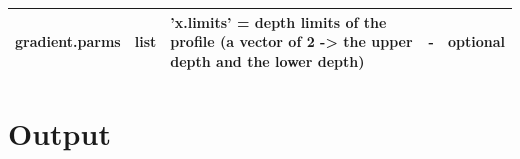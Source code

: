 \documentclass[10pt]{article}
\begin{document}
\begin{table}[!h]
\begin{tabular}{p{2.5cm} p{1.5cm} p{5cm} p{2cm} p{1.5cm} }
		 \textbf{gradient.parms} & list & 'x.limits' = depth limits of the profile (a vector of 2 -> the upper depth and the lower depth) & - & optional  \\
		 
		 \hline
	\end{tabular}
	\label{table_FLIPPERparms}
\end{table}

\section{Output}

\end{document}
